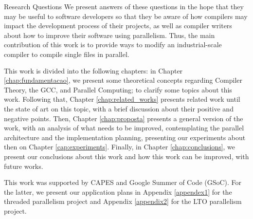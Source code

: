 \begin{section}{Research Questions}
We present answers of these questions in the hope that they may be useful to software
developers so that they be aware of how compilers may impact the development
process of their projects, as well as compiler writers about how to improve
their software using parallelism. Thus, the main contribution of this work is
to provide ways to modify an industrial-scale compiler to
compile single files in parallel.

This work is divided into the following chapters: in Chapter
\ref{chap:fundamentacao}, we present some theoretical concepts regarding
Compiler Theory, the GCC,  and Parallel Computing; to clarify some topics about this work.
Following that, Chapter \ref{chap:related_works} presents related work until
the state of art on this topic, with a brief discussion about their positive
and negative points. Then, Chapter \ref{chap:proposta} presents a general
version of the work, with an analysis of what needs to be improved,
contemplating the parallel architecture and the implementation planning, presenting
our experiments about then on Chapter \ref{cap:experiments}. Finally,
in Chapter \ref{chap:conclusions}, we present our conclusions about this work
and how this work can be improved, with future works.

This work was supported by CAPES and Google Summer of Code (GSoC). For the
latter, we present our application plans in Appendix \ref{appendex1} for the threaded
parallelism project and Appendix \ref{appendix2} for the LTO parallelism project.  


\end{section}
